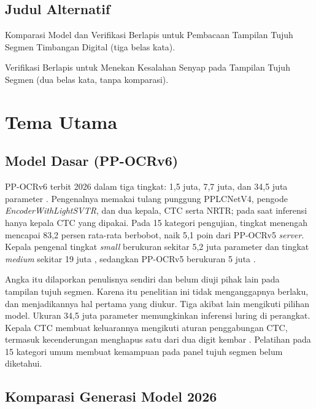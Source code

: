 \documentclass[12pt,a4paper,oneside]{report}
\newcommand{\parencite}[1]{\citep{#1}}
\begin{document}
\section{Judul Alternatif}

\begin{poin}
  \item Komparasi Model dan Verifikasi Berlapis untuk Pembacaan Tampilan Tujuh
        Segmen Timbangan Digital (tiga belas kata).
  \item Verifikasi Berlapis untuk Menekan Kesalahan Senyap pada Tampilan Tujuh
        Segmen (dua belas kata, tanpa komparasi).
\end{poin}

\chapter{Tema Utama}

\section{Model Dasar (PP-OCRv6)}

PP-OCRv6 terbit 2026 dalam tiga tingkat: 1,5 juta, 7,7 juta, dan 34,5 juta
parameter \parencite{zhang2026ppocrv6}. Pengenalnya memakai tulang punggung
PPLCNetV4, pengode \textit{EncoderWithLightSVTR}, dan dua kepala, CTC serta NRTR;
pada saat inferensi hanya kepala CTC yang dipakai. Pada 15 kategori pengujian,
tingkat menengah mencapai 83,2 persen rata-rata berbobot, naik 5,1 poin dari
PP-OCRv5 \textit{server}. Kepala pengenal tingkat \textit{small} berukuran sekitar
5,2 juta parameter dan tingkat \textit{medium} sekitar 19 juta
\parencite{zhang2026ppocrv6}, sedangkan PP-OCRv5 berukuran 5 juta
\parencite{zhang2026ppocrv5}.

Angka itu dilaporkan penulisnya sendiri dan belum diuji pihak lain pada tampilan
tujuh segmen. Karena itu penelitian ini tidak menganggapnya berlaku, dan
menjadikannya hal pertama yang diukur. Tiga akibat lain mengikuti pilihan model.
Ukuran 34,5 juta parameter memungkinkan inferensi luring di perangkat. Kepala CTC
membuat keluarannya mengikuti aturan penggabungan CTC, termasuk kecenderungan
menghapus satu dari dua digit kembar \parencite{graves2006ctc}. Pelatihan pada 15
kategori umum membuat kemampuan pada panel tujuh segmen belum diketahui.

\section{Komparasi Generasi Model 2026}
\end{document}

